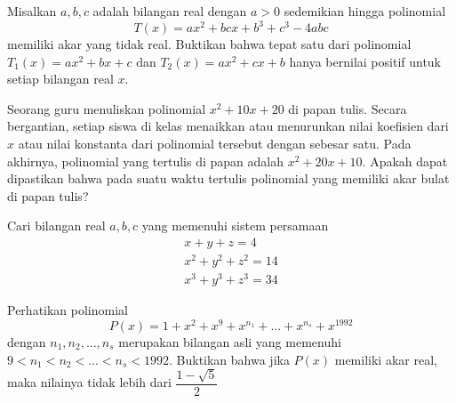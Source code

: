 \documentclass[11pt]{scrartcl}
\begin{document}
\begin{problem}
    Misalkan $a, b, c$ adalah bilangan real dengan $a > 0$ sedemikian hingga polinomial \[T(x) = ax^2 + bcx + b^3 + c^3 - 4abc\] memiliki akar yang tidak real. Buktikan bahwa tepat satu dari polinomial $T_1(x) = ax^2 + bx + c$ dan $T_2(x) = ax^2 + cx + b$ hanya bernilai positif untuk setiap bilangan real $x$.
\end{problem}

\begin{problem}
    [Auckland MO 2022] Seorang guru menuliskan polinomial $x^2 + 10x + 20$ di papan tulis. Secara bergantian, setiap siswa di kelas menaikkan atau menurunkan nilai koefisien dari $x$ atau nilai konstanta dari polinomial tersebut dengan sebesar satu. Pada akhirnya, polinomial yang tertulis di papan adalah $x^2 + 20x + 10$. Apakah dapat dipastikan bahwa pada suatu waktu tertulis polinomial yang memiliki akar bulat di papan tulis?
\end{problem}

\begin{problem}
    Cari bilangan real $a, b, c$ yang memenuhi sistem persamaan 
    \begin{align*}
        x + y + z = 4\\
        x^2 + y^2 + z^2 = 14 \\
        x^3 + y^3 + z^3 = 34
    \end{align*}
\end{problem}

\begin{problem}
    [Vietnam MO 1992] Perhatikan polinomial \[P(x) = 1 + x^2 + x^9 + x^{n_1} + ... + x^{n_s} + x^{1992}\] dengan $n_1, n_2 , ..., n_s$ merupakan bilangan asli yang memenuhi $9 < n_1 < n_2 < ... < n_s < 1992$. Buktikan bahwa jika $P(x)$ memiliki akar real, maka nilainya tidak lebih dari $\dfrac{1 - \sqrt{5}}{2}$
\end{problem}
\end{document}
